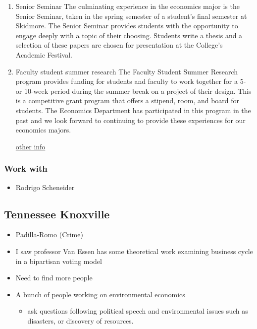 \documentclass[12pt]{article}
\theoremstyle{plain}
\theoremstyle{plain}
\theoremstyle{plain}
\theoremstyle{plain}
\theoremstyle{plain}
\theoremstyle{plain}
\begin{document}
\begin{enumerate}
\item Senior Seminar
\label{sec:org950d45c}
The culminating experience in the economics major is the Senior Seminar,
taken in the spring semester of a student's final semester at Skidmore.
The Senior Seminar provides students with the opportunity to engage deeply
with a topic of their choosing. Students write a thesis and a selection of
these papers are chosen for presentation at the College's Academic Festival. 


\item Faculty student summer research
\label{sec:org58c19c0}
The Faculty Student Summer Research program provides funding for students and faculty to work together for a
5- or 10-week period during the summer break on a project of their design.
This is a competitive grant program that offers a stipend, room, and board for students.
The Economics Department has participated in this program in the past and
we look forward to continuing to provide these experiences for our economics majors. 

\href{https://www.skidmore.edu/fdc/faculty\_student\_summer\_research/index.php}{other info}
\end{enumerate}

\subsubsection{Work with}
\label{sec:orge46a588}
\begin{itemize}
\item Rodrigo Scheneider
\end{itemize}
\subsection{Tennessee Knoxville}
\label{sec:org6cd888d}
\begin{itemize}
\item Padilla-Romo (Crime)
\item I saw professor Van Essen has some theoretical work examining business cycle in a bipartisan voting model
\item Need to find more people
\item A bunch of people working on environmental economics
\begin{itemize}
\item ask questions following political speech and environmental issues such as disasters, or discovery of resources.
\end{itemize}
\end{itemize}
\end{document}
